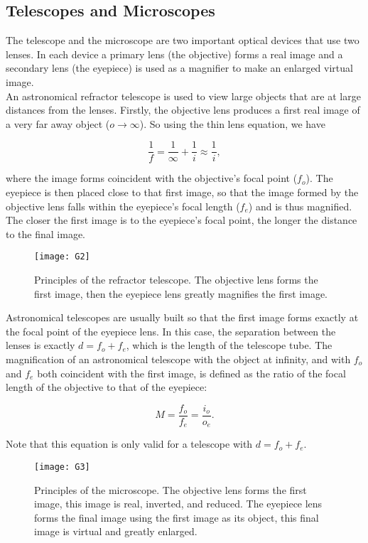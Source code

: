 \documentclass[a4paper,11pt]{article}
\begin{document}
\subsection*{Telescopes and Microscopes}

The telescope and the microscope are two important optical devices that use two lenses. In each device a primary lens (the objective) forms a real image and a secondary lens (the eyepiece) is used as a magnifier to make an enlarged virtual image.\\

An astronomical refractor telescope is used to view large objects that are at large distances from the lenses. Firstly, the objective lens produces a first real image of a very far away object (\(o \rightarrow \infty\)). So using the thin lens equation, we have

\begin{equation}
\frac{1}{f} = \frac{1}{\infty} + \frac{1}{i} \approx \frac{1}{i},
\end{equation}

where the image forms coincident with the objective’s focal point (\(f_o\)). The eyepiece is then placed close to that first image, so that the image formed by the objective lens falls within the eyepiece’s focal length (\(f_e\)) and is thus magnified. The closer the first image is to the eyepiece’s focal point, the longer the distance to the final image.

\begin{figure}[htbp]
\centering
\texttt{[image: G2]}
\caption{Principles of the refractor telescope. The objective lens forms the first image, then the eyepiece lens greatly magnifies the first image.}
\label{6}
\end{figure}

Astronomical telescopes are usually built so that the first image forms exactly at the focal point of the eyepiece lens. In this case, the separation between the lenses is exactly $d = f_o + f_e$, which is the length of the telescope tube. The magnification of an astronomical telescope with the object at infinity, and with $f_o$ and $f_e$ both coincident with the first image, is defined as the ratio of the focal length of the objective to that of the eyepiece:

\begin{equation}
M = \frac{f_o}{f_e} = \frac{i_o}{o_e}.
\end{equation}

Note that this equation is only valid for a telescope with $d = f_o + f_e$.
\newpage
\begin{figure}[h]
\centering
\texttt{[image: G3]}
\caption{Principles of the microscope. The objective lens forms the first image, this image is real, inverted, and reduced. The eyepiece lens forms the final image using the first image as its object, this final image is virtual and greatly enlarged.}
\label{6}
\end{figure}
\end{document}
